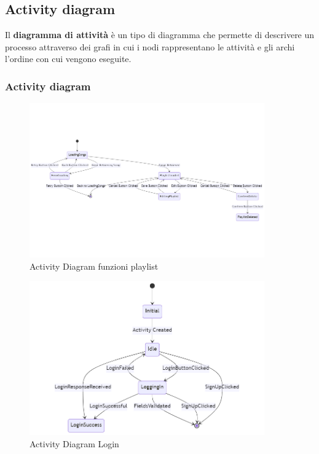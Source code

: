 \documentclass{article}
\begin{document}
		\subsection{Activity diagram}
		Il \textbf{diagramma di attività} è un tipo di diagramma che permette di descrivere un processo attraverso dei grafi in cui i nodi rappresentano le attività e gli archi l'ordine con cui vengono eseguite.
			\subsubsection{Activity diagram}
			\begin{figure}[H]
				\centering
				\includegraphics[width=0.9\textwidth]{Immagini/activitydiagramplaylist}
				\caption{Activity Diagram funzioni playlist}
			\end{figure}
			\vspace{0.9cm}
			\begin{figure}[H]
				\centering
				\includegraphics[width=0.9\textwidth]{Immagini/activitydiagramlogin}
				\caption{Activity Diagram Login}
			\end{figure}
\end{document}
